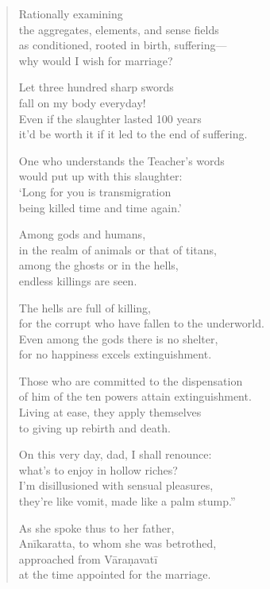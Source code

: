 \documentclass[12pt,openany]{book}%
\begin{document}
\begin{verse}
Rationally examining \\
the aggregates, elements, and sense fields \\
as conditioned, rooted in birth, suffering—\\
why would I wish for marriage? 

Let three hundred sharp swords \\
fall on my body everyday! \\
Even if the slaughter lasted 100 years \\
it’d be worth it if it led to the end of suffering. 

One who understands the Teacher’s words \\
would put up with this slaughter: \\
‘Long for you is transmigration \\
being killed time and time again.’ 

Among gods and humans, \\
in the realm of animals or that of titans, \\
among the ghosts or in the hells, \\
endless killings are seen. 

The hells are full of killing, \\
for the corrupt who have fallen to the underworld. \\
Even among the gods there is no shelter, \\
for no happiness excels extinguishment. 

Those who are committed to the dispensation \\
of him of the ten powers attain extinguishment. \\
Living at ease, they apply themselves \\
to giving up rebirth and death. 

On this very day, dad, I shall renounce: \\
what’s to enjoy in hollow riches? \\
I’m disillusioned with sensual pleasures, \\
they’re like vomit, made like a palm stump.” 

As she spoke thus to her father, \\
\textsanskrit{Anīkaratta}, to whom she was betrothed, \\
approached from \textsanskrit{Vāraṇavatī} \\
at the time appointed for the marriage. 


\end{verse}
\end{document}
